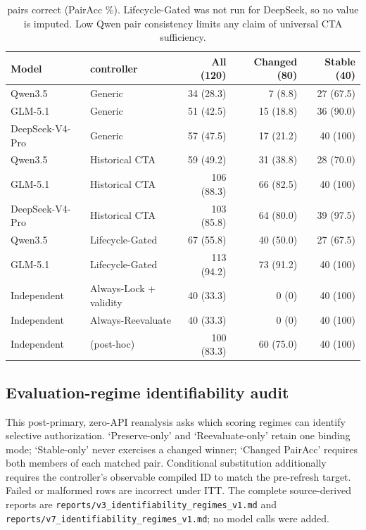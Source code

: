 \documentclass[10pt]{article}
\begin{document}
\begin{table}[h]
\centering
\scriptsize
\setlength{\tabcolsep}{3pt}
\begin{tabular}{llrrr}
\toprule
Model & \NewSchemaReplication{} controller & All (120) & Changed (80) & Stable (40) \\
\midrule
Qwen3.5 & Generic & 34 (28.3) & 7 (8.8) & 27 (67.5) \\
GLM-5.1 & Generic & 51 (42.5) & 15 (18.8) & 36 (90.0) \\
DeepSeek-V4-Pro & Generic & 57 (47.5) & 17 (21.2) & 40 (100) \\
Qwen3.5 & Historical CTA & 59 (49.2) & 31 (38.8) & 28 (70.0) \\
GLM-5.1 & Historical CTA & 106 (88.3) & 66 (82.5) & 40 (100) \\
DeepSeek-V4-Pro & Historical CTA & 103 (85.8) & 64 (80.0) & 39 (97.5) \\
Qwen3.5 & Lifecycle-Gated & 67 (55.8) & 40 (50.0) & 27 (67.5) \\
GLM-5.1 & Lifecycle-Gated & 113 (94.2) & 73 (91.2) & 40 (100) \\
Independent & Always-Lock + validity & 40 (33.3) & 0 (0) & 40 (100) \\
Independent & Always-Reevaluate & 40 (33.3) & 0 (0) & 40 (100) \\
Independent & \RuleStar{} (post-hoc) & 100 (83.3) & 60 (75.0) & 40 (100) \\
\bottomrule
\end{tabular}
\caption{\NewSchemaReplication{} pairs correct (PairAcc \%). Lifecycle-Gated was not run for DeepSeek, so no value
is imputed. Low Qwen pair consistency limits any claim of universal CTA sufficiency.}
\end{table}

\subsection{Evaluation-regime identifiability audit}
This post-primary, zero-API reanalysis asks which scoring regimes can identify selective
authorization. `Preserve-only' and `Reevaluate-only' retain one binding mode; `Stable-only'
never exercises a changed winner; `Changed PairAcc' requires both members of each matched pair.
Conditional substitution additionally requires the controller's observable compiled ID to match the
pre-refresh target. Failed or malformed rows are incorrect under ITT. The complete source-derived
reports are \texttt{reports/v3\_identifiability\_regimes\_v1.md} and
\texttt{reports/v7\_identifiability\_regimes\_v1.md}; no model calls were added.
\end{document}
